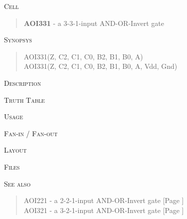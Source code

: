 
\label{AOI331}
\textsc{Cell}
\begin{quote}
    \textbf{AOI331} - a 3-3-1-input AND-OR-Invert gate
\end{quote}

\textsc{Synopsys}
\begin{quote}
    AOI331(Z, C2, C1, C0, B2, B1, B0, A) \\
    AOI331(Z, C2, C1, C0, B2, B1, B0, A, Vdd, Gnd)
\end{quote}

\textsc{Description}

%

\textsc{Truth Table}


\textsc{Usage}

\textsc{Fan-in / Fan-out}

\textsc{Layout}

\textsc{Files}

\textsc{See also}
\begin{quote}
    AOI221 - a 2-2-1-input AND-OR-Invert gate [Page \pageref{AOI221}] \\
    AOI321 - a 3-2-1-input AND-OR-Invert gate [Page \pageref{AOI321}]
\end{quote}
